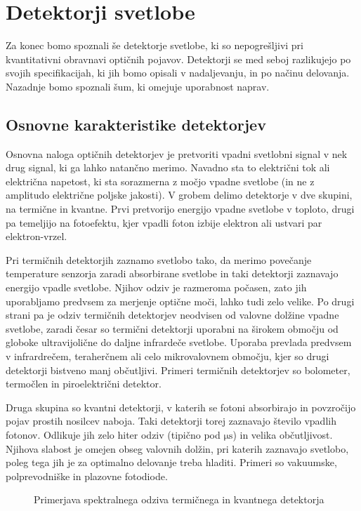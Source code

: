 
\chapter{Detektorji svetlobe}

Za konec bomo spoznali še detektorje svetlobe, ki so nepogrešljivi
pri kvantitativni obravnavi optičnih pojavov. Detektorji se med seboj razlikujejo
po svojih specifikacijah, ki jih bomo opisali v nadaljevanju, in po načinu delovanja. 
Nazadnje bomo spoznali šum, ki omejuje uporabnost naprav.

\section{Osnovne karakteristike detektorjev}

Osnovna naloga optičnih detektorjev je pretvoriti vpadni svetlobni signal 
v nek drug signal, ki ga lahko natančno merimo. Navadno sta to električni tok 
ali električna napetost, ki sta sorazmerna z močjo vpadne svetlobe 
(in ne z amplitudo električne poljske jakosti). V grobem delimo detektorje v dve skupini, 
na termične in kvantne. Prvi pretvorijo energijo vpadne svetlobe 
v toploto, drugi pa temeljijo na fotoefektu, kjer vpadli foton izbije elektron ali 
ustvari par elektron-vrzel.

Pri termičnih detektorjih zaznamo svetlobo tako,
da merimo povečanje temperature senzorja zaradi absorbirane svetlobe in taki detektorji
zaznavajo energijo vpadle svetlobe. Njihov odziv je razmeroma počasen, zato jih uporabljamo
predvsem za merjenje optične moči, lahko tudi zelo velike. Po drugi strani pa je odziv
termičnih detektorjev neodvisen
od valovne dolžine vpadne svetlobe, zaradi česar so termični detektorji uporabni na 
širokem območju od globoke ultravijolične do daljne infrardeče svetlobe. Uporaba
prevlada predvsem v infrardrečem, teraherčnem ali celo mikrovalovnem območju, kjer so 
drugi detektorji bistveno manj občutljivi. 
Primeri termičnih detektorjev so bolometer, termočlen in piroelektrični detektor.

Druga skupina so kvantni detektorji, v katerih se
fotoni absorbirajo in povzročijo pojav prostih nosilcev naboja. Taki detektorji
torej zaznavajo število vpadlih fotonov. Odlikuje jih zelo hiter odziv (tipično pod $\si{\micro\second}$)
in velika občutljivost. Njihova slabost je omejen obseg valovnih dolžin,
pri katerih zaznavajo svetlobo, poleg tega jih je za optimalno delovanje treba 
hladiti. Primeri so vakuumske, polprevodniške in plazovne fotodiode.
\begin{figure}[h]
\centering
\def\svgwidth{65truemm} 

\caption{Primerjava spektralnega odziva termičnega in kvantnega detektorja}
\label{fig:shemaTermKv}
\end{figure}

